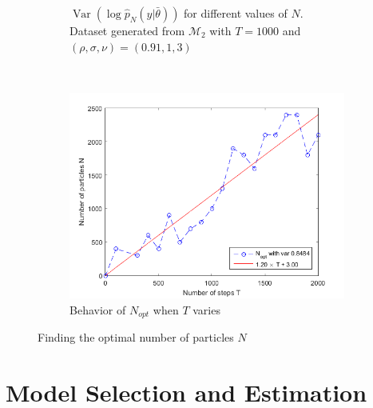\documentclass[11pt,a4,twosided,singlespacing,titlepagenumber=on]{scrreprt}
\numberwithin{equation}{chapter} %
\theoremstyle{remark}
\DeclareMathOperator{\var}{Var}
\begin{document}
\begin{figure}[H]
\begin{subfigure}[1b]{0.49\textwidth}
        \caption{$\var(\log \hat{p}_N(y|\bar{\theta}))$ for different values of $N$. Dataset generated from $\mathcal{M}_2$ with $T=1000$ and $(\rho,\sigma,\nu) = (0.91,1,3)$}
        \label{est_var_pn_theta_n}
    \end{subfigure} \\
    \begin{subfigure}[1b]{0.49\textwidth}
        \centering
        \includegraphics[width=1\textwidth]{n_opt_function_t}
        \caption{Behavior of $N_{opt}$ when $T$ varies}
        \label{n_opt_function_t}
    \end{subfigure}
    \caption{Finding the optimal number of particles $N$}
\end{figure}

\chapter{Model Selection and Estimation}

\end{document}
